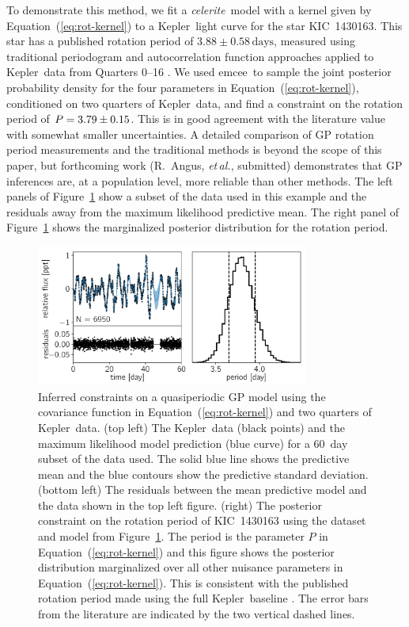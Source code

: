 \documentclass[manuscript, letterpaper]{aastex6}
\newcommand{\project}[1]{\textsf{#1}}
\newcommand{\kepler}{\project{Kepler}}
\newcommand{\celeriteterm}{\emph{celerite}}
\newcommand{\emcee}{\project{emcee}}
\newcommand{\foreign}[1]{\emph{#1}}
\newcommand{\etal}{\foreign{et\,al.}}
\newcommand{\figureref}[1]{\ref{fig:#1}}
\newcommand{\Figure}[1]{Figure~\figureref{#1}}
\newcommand{\figurelabel}[1]{\label{fig:#1}}
\renewcommand{\eqref}[1]{\ref{eq:#1}}
\newcommand{\Eq}[1]{Equation~(\eqref{#1})}
\newcommand{\eq}[1]{\Eq{#1}}
\begin{document}
To demonstrate this method, we fit a \celeriteterm\ model with a kernel given
by \eq{rot-kernel} to a \kepler\ light curve for the star KIC~1430163.
This star has a published rotation period of $3.88 \pm 0.58\,\mathrm{days}$,
measured using traditional periodogram and autocorrelation function approaches
applied to \kepler\ data from Quarters 0--16 \citep{Mathur:2014}.
We used \emcee\ to sample the joint posterior probability density for the four
parameters in \eq{rot-kernel}, conditioned on two quarters of \kepler\ data,
and find a constraint on the rotation period of $P = {3.79 \pm 0.15}$.
This is in good agreement with the literature value with somewhat smaller
uncertainties.
A detailed comparison of GP rotation period measurements and the traditional
methods is beyond the scope of this paper, but forthcoming work (R.~Angus,
\etal, submitted) demonstrates that GP inferences are, at a population level,
more reliable than other methods.
The left panels of \Figure{rotation} show a subset of the data used in this
example and the residuals away from the maximum likelihood predictive mean.
The right panel of \Figure{rotation} shows the marginalized posterior
distribution for the rotation period.



\begin{figure}[p]
\begin{center}
\includegraphics[width=0.8\textwidth]{figures/rotation/rotation.pdf}
\caption{Inferred constraints on a quasiperiodic GP model using the covariance
    function in \eq{rot-kernel} and two quarters of \kepler\ data.
(top left) The \kepler\ data (black points) and the maximum likelihood model
    prediction (blue curve) for a 60~day subset of the data used.
    The solid blue line shows the predictive mean and the blue contours show
    the predictive standard deviation.
(bottom left) The residuals between the mean predictive model and the data
    shown in the top left figure.
(right) The posterior constraint on the rotation period of KIC~1430163 using
    the dataset and model from \Figure{rotation}.
    The period is the parameter $P$ in \eq{rot-kernel} and this figure shows
    the posterior distribution marginalized over all other nuisance parameters
    in \eq{rot-kernel}.
    This is consistent with the published rotation period made using the full
    \kepler\ baseline \citep{Mathur:2014}.
    The error bars from the literature are indicated by the two vertical
    dashed lines.
    \figurelabel{rotation}}
\end{center}
\end{figure}
\end{document}
